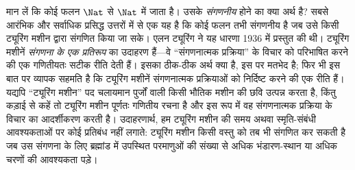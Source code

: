 \documentclass[../../../include/open-logic-section]{subfiles}
\begin{document}

मान लें कि कोई फलन $\Nat$ से $\Nat$ में जाता है। उसके
\emph{संगणनीय} होने का क्या अर्थ है? सबसे आरंभिक और सर्वाधिक प्रसिद्ध
उत्तरों में से एक यह है कि कोई फलन तभी संगणनीय है जब उसे किसी ट्यूरिंग
मशीन द्वारा संगणित किया जा सके। एलन ट्यूरिंग ने यह धारणा 1936 में
प्रस्तुत की थी। ट्यूरिंग मशीनें \emph{संगणना के एक प्रतिरूप} का उदाहरण
हैं---वे ``संगणनात्मक प्रक्रिया'' के विचार को परिभाषित करने की एक
गणितीयतः सटीक रीति देती हैं। इसका ठीक-ठीक अर्थ क्या है, इस पर मतभेद है;
फिर भी इस बात पर व्यापक सहमति है कि ट्यूरिंग मशीनें संगणनात्मक
प्रक्रियाओं को निर्दिष्ट करने की एक रीति हैं। यद्यपि ``ट्यूरिंग मशीन''
पद चलायमान पुर्जों वाली किसी भौतिक मशीन की छवि उत्पन्न करता है, किंतु
कड़ाई से कहें तो ट्यूरिंग मशीन पूर्णतः गणितीय रचना है और इस रूप में वह
संगणनात्मक प्रक्रिया के विचार का आदर्शीकरण करती है। उदाहरणार्थ, हम
ट्यूरिंग मशीन की समय अथवा स्मृति-संबंधी आवश्यकताओं पर कोई प्रतिबंध नहीं
लगाते: ट्यूरिंग मशीन किसी वस्तु को तब भी संगणित कर सकती है जब उस संगणना
के लिए ब्रह्मांड में उपस्थित परमाणुओं की संख्या से अधिक भंडारण-स्थान या
अधिक चरणों की आवश्यकता पड़े।
\end{document}
